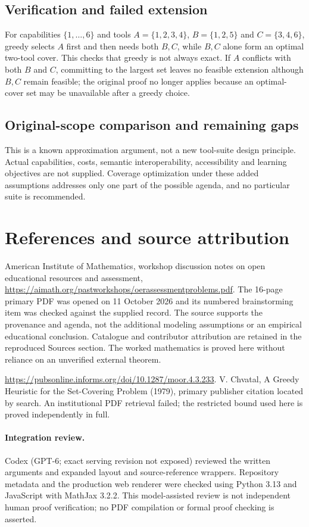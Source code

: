 \documentclass[11pt]{article}
\begin{document}
\subsection{Verification and failed extension}
For capabilities $\{1,\ldots,6\}$ and tools $A=\{1,2,3,4\}$, $B=\{1,2,5\}$ and $C=\{3,4,6\}$, greedy selects $A$ first and then needs both $B,C$, while $B,C$ alone form an optimal two-tool cover. This checks that greedy is not always exact. If $A$ conflicts with both $B$ and $C$, committing to the largest set leaves no feasible extension although $B,C$ remain feasible; the original proof no longer applies because an optimal-cover set may be unavailable after a greedy choice.
\subsection{Original-scope comparison and remaining gaps}
This is a known approximation argument, not a new tool-suite design principle. Actual capabilities, costs, semantic interoperability, accessibility and learning objectives are not supplied. Coverage optimization under these added assumptions addresses only one part of the possible agenda, and no particular suite is recommended.

\section{References and source attribution}
American Institute of Mathematics, workshop discussion notes on open educational resources and assessment, \url{https://aimath.org/pastworkshops/oerassessmentproblems.pdf}. The 16-page primary PDF was opened on 11 October 2026 and its numbered brainstorming item was checked against the supplied record. The source supports the provenance and agenda, not the additional modeling assumptions or an empirical educational conclusion. Catalogue and contributor attribution are retained in the reproduced Sources section. The worked mathematics is proved here without reliance on an unverified external theorem.

\url{https://pubsonline.informs.org/doi/10.1287/moor.4.3.233}. V. Chvatal, A Greedy Heuristic for the Set-Covering Problem (1979), primary publisher citation located by search. An institutional PDF retrieval failed; the restricted bound used here is proved independently in full.


\paragraph{Integration review.} Codex (GPT-6; exact serving revision not exposed) reviewed the written arguments and expanded layout and source-reference wrappers. Repository metadata and the production web renderer were checked using Python 3.13 and JavaScript with MathJax 3.2.2. This model-assisted review is not independent human proof verification; no PDF compilation or formal proof checking is asserted.
\end{document}
